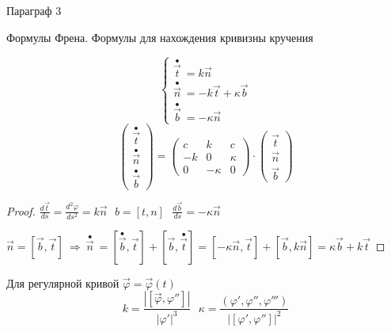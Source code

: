 \begin{title}
  Параграф 3
\end{title}

\begin{title}
  Формулы Френа. Формулы для нахождения кривизны кручения
\end{title}

\begin{theorem}
  $$
  \left\{
  \begin{array}{c}
    \stackrel{\bullet}{\vec t} ~ = k \vec n \\
    \stackrel{\bullet}{\vec n} ~ = -k \vec t + \kappa \vec b \\
    \stackrel{\bullet}{\vec b} ~ = - \kappa \vec n
  \end{array}
  \right.
  $$
  $$
  \left(
  \begin{array}{c}
    \stackrel{\bullet}{\vec t} \\
    \stackrel{\bullet}{\vec n} \\
    \stackrel{\bullet}{\vec b}
  \end{array}
  \right) =
  \left(
  \begin{array}{ccc}
    c & k & c \\
    -k & 0 & \kappa \\
    0 & -\kappa & 0
  \end{array}
  \right) \cdot
  \left(
  \begin{array}{ccc}
    \vec t \\
    \vec n \\
    \vec b
  \end{array}
  \right)
  $$
\end{theorem}

\begin{proof}
  $
  \frac{d\vec t}{ds} = \frac{d^2 \varphi}{ds^2} = k \vec n ~~~ b = [t,n] ~~~
  \frac{d\vec b}{ds} = - \kappa \vec n
  $

  $
  \vec n = [\vec b, \vec t] ~ \Rightarrow ~ \stackrel{\bullet}{\vec n}~ =
  [\stackrel{\bullet}{\vec b}, \vec t] + [\vec b, \stackrel{\bullet}{\vec t}]
  = [-\kappa \vec n, \vec t] + [\vec b, k \vec n] = \kappa \vec b + k \vec t
  $
\end{proof}

\begin{theorem}
  Для регулярной кривой $\vec \varphi = \vec \varphi(t)$
  $$
  k = \frac{|[\vec \varphi, \varphi'']|}{|\varphi'|^3} ~~~
  \kappa = \frac{(\varphi', \varphi'', \varphi''')}{|[\varphi', \varphi'']|^2}
  $$
\end{theorem}

